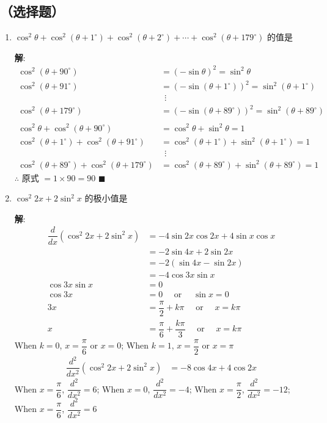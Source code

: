 \documentclass{report}
\newcommand{\sol}{\vspace{0.2cm}\textbf{解}:}
\begin{document}
\subsection*{（选择题）}
\begin{enumerate}[leftmargin=*]
    \item $\cos ^2 \theta+\cos ^2\left(\theta+1^{\circ}\right)+\cos ^2\left(\theta+2^{\circ}\right)+\cdots+\cos ^2\left(\theta+179^{\circ}\right)$ 的值是
    
    \sol{}
    \begin{align*}
        \cos^2(\theta + 90^{ \circ}) &= (-\sin \theta)^2 = \sin^2 \theta \\
        \cos^2(\theta + 91^{ \circ}) &= (-\sin(\theta + 1^{ \circ}))^2 = \sin^2(\theta + 1^{ \circ}) \\
        &\ \ \vdots \\
        \cos^2(\theta + 179^{ \circ}) &= (-\sin(\theta + 89^{ \circ}))^2 = \sin^2(\theta + 89^{ \circ}) \\
        \\
        \cos^2 \theta+\cos^2(\theta+90^{ \circ}) &= \cos^2 \theta + \sin^2 \theta = 1 \\
        \cos^2(\theta+1^{ \circ})+\cos^2(\theta+91^{ \circ}) &= \cos^2(\theta+1^{ \circ}) + \sin^2(\theta+1^{ \circ}) = 1 \\
        &\ \ \vdots \\
        \cos^2(\theta+89^{ \circ})+\cos^2(\theta+179^{ \circ}) &= \cos^2(\theta+89^{ \circ}) + \sin^2(\theta+89^{ \circ}) = 1 
    \end{align*}
    $\therefore$ 原式 $= 1 \times 90 = 90$ \hfill $\blacksquare$

    \item $\cos ^2 2 x+2 \sin ^2 x$ 的极小值是
    
    \sol{}
    \begin{align*}
        \dfrac{d}{dx}(\cos^2 2x+2\sin^2 x) &= -4\sin 2x \cos 2x + 4\sin x \cos x \\
        &= -2\sin 4x + 2\sin 2x \\
        & = -2(\sin 4x - \sin 2x) \\
        & = -4\cos 3x \sin x \\
        \cos 3x \sin x &= 0 \\
        \cos 3x &= 0 \quad \text{ or } \quad \sin x = 0 \\
        3x &= \dfrac{\pi}{2} + k\pi \quad \text{ or } \quad x = k\pi \\
        x &= \dfrac{\pi}{6} + \dfrac{k\pi}{3} \quad \text{ or } \quad x = k\pi
    \end{align*}
    When $k = 0$, $x = \dfrac{\pi}{6}$ or $x = 0$; When $k = 1$, $x = \dfrac{\pi}{2}$ or $x = \pi$ \\
    \begin{align*}
        \dfrac{d^2}{dx^2}(\cos^2 2x+2\sin^2 x) &= -8\cos 4x + 4\cos 2x
    \end{align*}
    When $x = \dfrac{\pi}{6}$, $\dfrac{d^2}{dx^2} = 6$; When $x = 0$, $\dfrac{d^2}{dx^2} = -4$; When $x = \dfrac{\pi}{2}$, $\dfrac{d^2}{dx^2} = -12$; When $x = \dfrac{\pi}{6}$, $\dfrac{d^2}{dx^2} = 6$


\end{enumerate}
\end{document}
